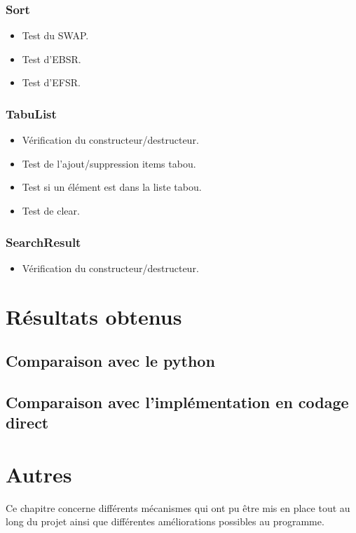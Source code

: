 \documentclass[hideweeklyreports]{polytech/polytech}
\begin{document}
			\subsection{Sort}
				\begin{itemize}
					\item Test du SWAP.
					\item Test d'EBSR.
					\item Test d'EFSR.
				\end{itemize}
				
			\subsection{TabuList}
				\begin{itemize}
					\item Vérification du constructeur/destructeur.
					\item Test de l'ajout/suppression items tabou.
					\item Test si un élément est dans la liste tabou.
					\item Test de clear.
				\end{itemize}
				
			\subsection{SearchResult}
				\begin{itemize}
					\item Vérification du constructeur/destructeur.
				\end{itemize}
		
	\chapter{Résultats obtenus}
		\section{Comparaison avec le python} %
		\section{Comparaison avec l'implémentation en codage direct} %
	
	\chapter{Autres}
		Ce chapitre concerne différents mécanismes qui ont pu être mis en place tout au long du projet ainsi que différentes améliorations possibles au programme.
		
\end{document}
